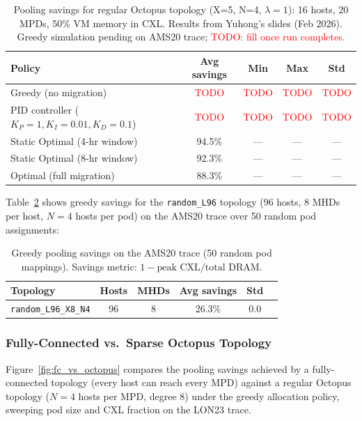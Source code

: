 \documentclass[11pt]{article}
\newcommand{\red}[1]{\textcolor{red}{#1}}
\begin{document}
\begin{table}[H]
\centering
\small
\begin{tabular}{lcccc}
\toprule
\textbf{Policy} & \textbf{Avg savings} & \textbf{Min} & \textbf{Max} & \textbf{Std} \\
\midrule
Greedy (no migration)          & \red{TODO} & \red{TODO} & \red{TODO} & \red{TODO} \\
PID controller ($K_P{=}1, K_I{=}0.01, K_D{=}0.1$) & \red{TODO} & \red{TODO} & \red{TODO} & \red{TODO} \\
Static Optimal (4-hr window)   & 94.5\%     & ---        & ---        & ---        \\
Static Optimal (8-hr window)   & 92.3\%     & ---        & ---        & ---        \\
Optimal (full migration)       & 88.3\%     & ---        & ---        & ---        \\
\bottomrule
\end{tabular}
\caption{Pooling savings for regular Octopus topology (X=5, N=4, $\lambda=1$):
16 hosts, 20 MPDs, 50\% VM memory in CXL\@.
Results from Yuhong's slides (Feb 2026).
Greedy simulation pending on AMS20 trace; \red{TODO: fill once run completes}.}
\label{tab:greedy_vs_opt}
\end{table}

Table~\ref{tab:random96} shows greedy savings for the \texttt{random\_L96}
topology (96 hosts, 8 MHDs per host, $N=4$ hosts per pod) on the AMS20 trace
over 50 random pod assignments:

\begin{table}[H]
\centering
\small
\begin{tabular}{lccccc}
\toprule
\textbf{Topology} & \textbf{Hosts} & \textbf{MHDs} & \textbf{Avg savings} & \textbf{Std} \\
\midrule
\texttt{random\_L96\_X8\_N4} & 96 & 8 & 26.3\% & 0.0 \\
\bottomrule
\end{tabular}
\caption{Greedy pooling savings on the AMS20 trace (50 random pod mappings).
Savings metric: $1 - \text{peak CXL}/\text{total DRAM}$.}
\label{tab:random96}
\end{table}

\subsubsection*{Fully-Connected vs.\ Sparse Octopus Topology}

Figure~\ref{fig:fc_vs_octopus} compares the pooling savings achieved by a
fully-connected topology (every host can reach every MPD) against a regular
Octopus topology ($N = 4$ hosts per MPD, degree 8) under the greedy
allocation policy, sweeping pod size and CXL fraction on the LON23 trace.
\end{document}
